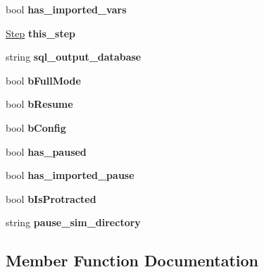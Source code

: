 \begin{DoxyCompactItemize}
\item 
bool {\bfseries has\+\_\+imported\+\_\+vars}\hypertarget{class_tree_a97bde28466a098bb9e58c1bd5610fd68}{}\label{class_tree_a97bde28466a098bb9e58c1bd5610fd68}

\item 
\hyperlink{struct_step}{Step} {\bfseries this\+\_\+step}\hypertarget{class_tree_af7de4d4f04360edcbe2a20db882b1f87}{}\label{class_tree_af7de4d4f04360edcbe2a20db882b1f87}

\item 
string {\bfseries sql\+\_\+output\+\_\+database}\hypertarget{class_tree_a80d3e92108eb472df49640a661ef4f7d}{}\label{class_tree_a80d3e92108eb472df49640a661ef4f7d}

\item 
bool {\bfseries b\+Full\+Mode}\hypertarget{class_tree_a7a32ee0d04641ae745c08f7278c36c13}{}\label{class_tree_a7a32ee0d04641ae745c08f7278c36c13}

\item 
bool {\bfseries b\+Resume}\hypertarget{class_tree_ac9cbd7d17fb511c1fcc70c765f6440b0}{}\label{class_tree_ac9cbd7d17fb511c1fcc70c765f6440b0}

\item 
bool {\bfseries b\+Config}\hypertarget{class_tree_a6c8c76aec6a9faef9c38f4f275b0793d}{}\label{class_tree_a6c8c76aec6a9faef9c38f4f275b0793d}

\item 
bool {\bfseries has\+\_\+paused}\hypertarget{class_tree_aaa64e29ab7bc3c6f48d454063f0c39e1}{}\label{class_tree_aaa64e29ab7bc3c6f48d454063f0c39e1}

\item 
bool {\bfseries has\+\_\+imported\+\_\+pause}\hypertarget{class_tree_ad8d1d7e4fa673b28542ba31c5b637856}{}\label{class_tree_ad8d1d7e4fa673b28542ba31c5b637856}

\item 
bool {\bfseries b\+Is\+Protracted}\hypertarget{class_tree_a1f7515f16d99a9748ab2c4c667f1ffc4}{}\label{class_tree_a1f7515f16d99a9748ab2c4c667f1ffc4}

\item 
string {\bfseries pause\+\_\+sim\+\_\+directory}\hypertarget{class_tree_a504a4d7ae23146fd6236baa59da51a6e}{}\label{class_tree_a504a4d7ae23146fd6236baa59da51a6e}

\end{DoxyCompactItemize}


\subsection{Member Function Documentation}
